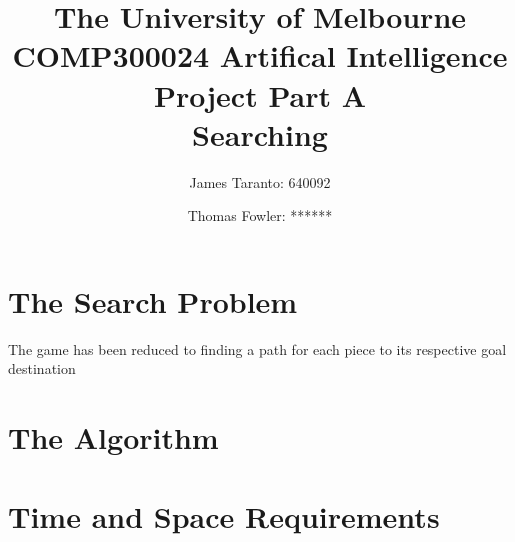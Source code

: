 \documentclass[a4paper,11pt,draft]{article}
\title{
    The University of Melbourne\\
    COMP300024 Artifical Intelligence\\
    Project Part A\\
    Searching
}
\author{
    James Taranto: 640092\\
    \and
    Thomas Fowler: ******\\
}
\begin{document}
\maketitle
\section{The Search Problem}
The game has been reduced to finding a path for each piece to its respective goal destination
\section{The Algorithm}
\section{Time and Space Requirements}
\end{document}
